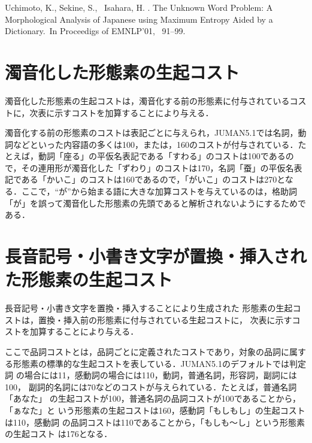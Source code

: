 \documentclass[japanese]{jnlp_1.4}
\begin{document}
\begin{thebibliography}{}
Uchimoto, K., Sekine, S., \BBA\ Isahara, H. \BBCP.
\newblock \BBOQ The Unknown Word Problem: A Morphological Analysis of Japanese
  using Maximum Entropy Aided by a Dictionary.\BBCQ\
\newblock In {\Bem Proceedigs of EMNLP'01}, \mbox{\BPGS\ 91--99}.

\end{thebibliography}


\appendix

 \section{濁音化した形態素の生起コスト}
 \label{APPEND::A}
 濁音化した形態素の生起コストは，濁音化する前の形態素に付与されているコス
 トに，次表に示すコストを加算することにより与える．
 
 \begin{table}[h]

 \end{table}

濁音化する前の形態素のコストは表記ごとに与えられ，JUMAN5.1では名詞，動
 詞などといった内容語の多くは100，または，160のコストが付与されている．た
 とえば，動詞「座る」の平仮名表記である「すわる」のコストは100であるの
 で，その連用形が濁音化した「ずわり」のコストは170，名詞「蚕」の平仮名表
 記である「かいこ」のコストは160であるので，「がいこ」のコストは270とな
 る．ここで，``が''から始まる語に大きな加算コストを与えているのは，格助詞
 「が」を誤って濁音化した形態素の先頭であると解析されないようにするためで
 ある．
    

 \section{長音記号・小書き文字が置換・挿入された形態素の生起コスト}
 \label{APPEND::B}

 長音記号・小書き文字を置換・挿入することにより生成された
 形態素の生起コストは，置換・挿入前の形態素に付与されている生起コストに，
 次表に示すコストを加算することにより与える．

\begin{table}[h]

 \end{table}

 ここで品詞コストとは，品詞ごとに定義されたコストであり，対象の品詞に属す
 る形態素の標準的な生起コストを表している．JUMAN5.1のデフォルトでは判定詞
 の場合には11，感動詞の場合には110，動詞，普通名詞，形容詞，副詞には100，
 副詞的名詞には70などのコストが与えられている．たとえば，普通名詞「あなた」
 の生起コストが100，普通名詞の品詞コストが100であることから，「ぁなた」と
 いう形態素の生起コストは160，感動詞「もしもし」の生起コストは110，感動詞
 の品詞コストは110であることから，「もしも〜し」という形態素の生起コスト
 は176となる．
\end{document}
